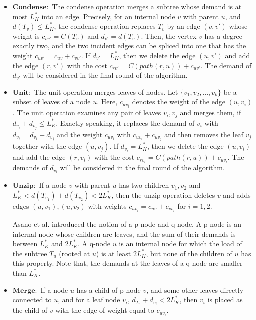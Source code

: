 \begin{itemize} 
\item[] $\mathbf{Condense:}$ The condense operation merges a subtree whose demand is at most $L_K^*$ into an edge. Precisely, for an internal node $v$ with parent  $u$, and $d(T_v) \le L_K^*$, the condense operation replaces $T_v$ by an edge $(v,v')$ whose weight is $c_{vv'}=C(T_v)$ and $d_{v'}=d(T_v)$. Then, the vertex $v$ has a degree exactly two, and the two incident edges can be spliced into one that has the weight $c_{uv'}=c_{uv}+c_{vv'}$. If $d_{v'}=L_K^*$, then we delete the edge $(u,v')$ and add the edge $(r,v')$ with the cost $c_{rv'}=C(path(r,u))+c_{uv'}$. The demand of $d_{v'}$ will be considered in the final round of the algorithm. 
\item[] $\mathbf{Unit:}$ The unit operation merges leaves of nodes. Let $\{v_1,v_2,...,v_k\}$ be a subset of leaves of a node $u$. Here, $c_{uv_i}$ denotes the weight of the edge $(u,v_i)$. The unit operation examines any pair of leaves $v_i, v_j$ and merges them, if $d_{v_i}+d_{v_j} \le L_K^*$. Exactly speaking, it replaces the demand of $v_i$ with $d_{v_i}=d_{v_i}+d_{v_j}$ and the weight $c_{uv_i}$ with $c_{uv_i}+c_{uv_j}$ and then removes the leaf $v_j$ together with the edge $(u,v_j)$. If $d_{v_i}=L_K^*$, then we delete the edge $(u,v_i)$ and add the edge $(r,v_i)$ with the cost $c_{rv_i}=C(path(r,u))+c_{uv_i}$. The demands of $d_{v_i}$ will be considered in the final round of the algorithm. 
\item[] $\mathbf{Unzip:}$ If a node $v$ with parent  $u$ has two children $v_1,v_2$ and $L_K^* <d(T_{v_1})+d(T_{v_2}) < 2L_K^*$, then the unzip operation deletes $v$ and adds edges $(u,v_1), (u, v_2)$ with weights $c_{uv_i}=c_{uv}+c_{vv_i}$ for $i=1,2$.

\indent Asano et al. \cite{Asano2001} introduced the notion of a p-node and q-node. A p-node is an internal node whose children are leaves, and the sum of their demands is between $L_K^*$ and $2L_K^*$. A q-node $u$ is an internal node for which the load of the subtree $T_u$ (rooted at $u$) is at least $2L_K^*$, but none of the children of $u$ has this property. Note that, the demands at the leaves of a q-node are smaller than $L_K^*$.
\item[] $\mathbf{Merge:}$ If a node $u$ has a child of p-node $v$, and some other leaves directly connected to $u$, and for a leaf node $v_i$, $d_{T_v}+d_{v_i}<2L_K^*$, then $v_i$ is placed as the child of $v$ with the edge of weight equal to $c_{uv_i}$. 
\end{itemize}

